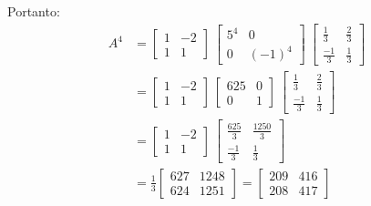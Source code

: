 \documentclass[a4paper,12pt]{article}
\begin{document}
\begin{enumerate}
    Portanto:
    \begin{align*}
        A^4 &= \begin{bmatrix}
        1 & -2 \\
        1 & 1
    \end{bmatrix}\ \begin{bmatrix}
        5^4 &  0\\
        0 & (-1)^4
    \end{bmatrix}\ \begin{bmatrix}
         \frac{1}{3} &  \frac{2}{3}\\
         \frac{-1}{3} &  \frac{1}{3}
    \end{bmatrix}\\
    &=\begin{bmatrix}
        1 & -2 \\
        1 & 1
    \end{bmatrix}\ \begin{bmatrix}
        625 &  0\\
        0 & 1
    \end{bmatrix}\ \begin{bmatrix}
         \frac{1}{3} &  \frac{2}{3}\\
         \frac{-1}{3} &  \frac{1}{3}
    \end{bmatrix}\\
    &=\begin{bmatrix}
        1 & -2 \\
        1 & 1
    \end{bmatrix}\ \begin{bmatrix}
         \frac{625}{3} &  \frac{1250}{3}\\
         \frac{-1}{3} &  \frac{1}{3}
    \end{bmatrix}\\
    &=\frac{1}{3} \begin{bmatrix}
         627 &  1248\\
         624 &  1251
    \end{bmatrix} = \begin{bmatrix}
         209 &  416\\
         208 &  417
    \end{bmatrix}\\
    \end{align*}


\end{enumerate}
\end{document}
